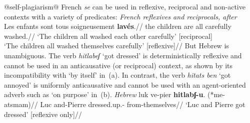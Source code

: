 @self-plagiarism@
French \emph{se} can be used in reflexive, reciprocal and non-active contexts with a variety of predicates:
\ex
	\textit{French reflexives and reciprocals, after} \citet[839]{labelle08}\\
	\begingl
	\gla Les enfants  sont tous soigneusement \textbf{lav\'es}.//
	\glb the children  are all carefully washed.//
	\glft `The children all washed each other carefully' \hfill [reciprocal]\\
	`The children all washed themselves carefully' \hfill [reflexive]//
	\endgl
\xe
%
%	
%
But Hebrew {\thit} is unambiguous. The verb \emph{hitlabeʃ} `got dressed' is deterministically reflexive and cannot be used in an anticausative (or reciprocal) context, as shown by its incompatibility with `by itself' in~(\nextx a). In contrast, the verb \emph{hitats ben} `got annoyed' is uniformly anticausative and cannot be used with an agent-oriented adverb such as `on purpose' \citep{alexiadouanagnostopoulou04} in~(\nextx b).
\pex \textit{Hebrew}
	\a \begingl
	\gla luk ve-pier \textbf{hitlabʃ-u}. (*me-a{ts}mam)//
	\glb Luc and-Pierre dressed.up.- \phantom{(*}from-themselves//
	\glft `Luc and Pierre got dressed' \hfill [reflexive only]//
	\endgl

